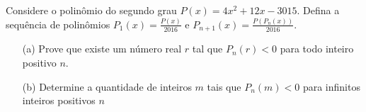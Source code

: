 Considere o polinômio do segundo grau $P(x) = 4x^2 + 12x - 3015$.
Defina a sequência de polinômios $P_1(x) = \frac{P(x)}{2016}$ e $P_{n+1}(x) = \frac{P(P_{n}(x))}{2016}$.
\begin{itemize}
    \item[(a)] Prove que existe um número real $r$ tal que $P_n(r) < 0$ para todo inteiro positivo $n$.
    \item[(b)] Determine a quantidade de inteiros $m$ tais que $P_n(m) < 0$ para infinitos inteiros positivos $n$
\end{itemize}